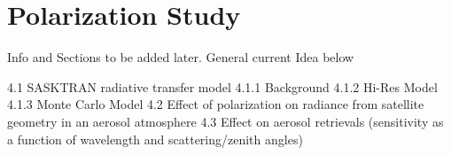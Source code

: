 \chapter{Polarization Study} 

Info and Sections to be added later. General current Idea below

    4.1 SASKTRAN radiative transfer model
        4.1.1 Background
        4.1.2 Hi-Res Model
        4.1.3 Monte Carlo Model
    4.2 Effect of polarization on radiance from satellite geometry in an aerosol atmosphere
    4.3 Effect on aerosol retrievals (sensitivity as a function of wavelength and scattering/zenith angles)
